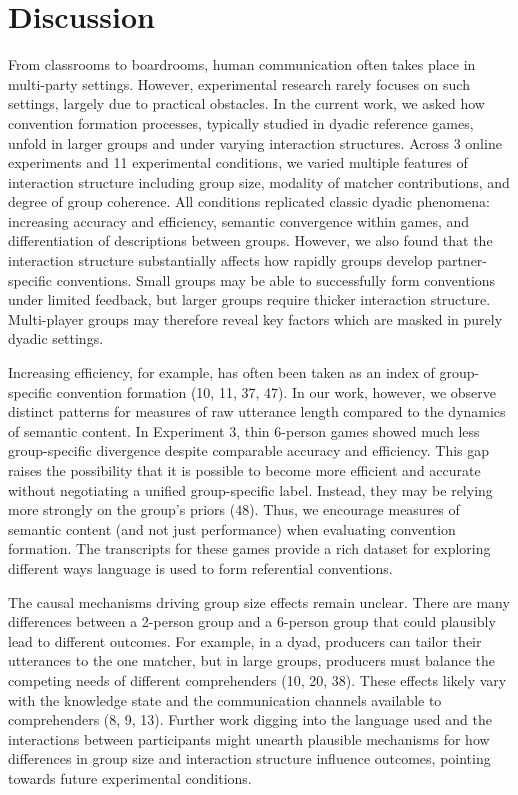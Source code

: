 \documentclass[9pt,twocolumn,twoside]{pnas-new}
\begin{document}
\section*{Discussion}\label{discussion}

From classrooms to boardrooms, human communication often takes place in
multi-party settings. However, experimental research rarely focuses on
such settings, largely due to practical obstacles. In the current work,
we asked how convention formation processes, typically studied in dyadic
reference games, unfold in larger groups and under varying interaction
structures. Across 3 online experiments and 11 experimental conditions,
we varied multiple features of interaction structure including group
size, modality of matcher contributions, and degree of group coherence.
All conditions replicated classic dyadic phenomena: increasing accuracy
and efficiency, semantic convergence within games, and differentiation
of descriptions between groups. However, we also found that the
interaction structure substantially affects how rapidly groups develop
partner-specific conventions. Small groups may be able to successfully
form conventions under limited feedback, but larger groups require
thicker interaction structure. Multi-player groups may therefore reveal
key factors which are masked in purely dyadic settings.

Increasing efficiency, for example, has often been taken as an index of
group-specific convention formation (10, 11, 37, 47). In our work,
however, we observe distinct patterns for measures of raw utterance
length compared to the dynamics of semantic content. In Experiment 3,
thin 6-person games showed much less group-specific divergence despite
comparable accuracy and efficiency. This gap raises the possibility that
it is possible to become more efficient and accurate without negotiating
a unified group-specific label. Instead, they may be relying more
strongly on the group's priors (48). Thus, we encourage measures of
semantic content (and not just performance) when evaluating convention
formation. The transcripts for these games provide a rich dataset for
exploring different ways language is used to form referential
conventions.

The causal mechanisms driving group size effects remain unclear. There
are many differences between a 2-person group and a 6-person group that
could plausibly lead to different outcomes. For example, in a dyad,
producers can tailor their utterances to the one matcher, but in large
groups, producers must balance the competing needs of different
comprehenders (10, 20, 38). These effects likely vary with the knowledge
state and the communication channels available to comprehenders (8, 9,
13). Further work digging into the language used and the interactions
between participants might unearth plausible mechanisms for how
differences in group size and interaction structure influence outcomes,
pointing towards future experimental conditions.
\end{document}
